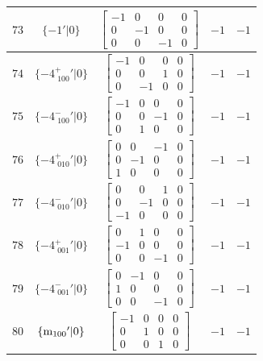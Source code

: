 \documentclass[fleqn,8pt]{jsarticle}
\begin{document}
\begin{longtable}{ccccc}
$ 73 $ & $ \{-1{}'|0\} $ & $ \begin{bmatrix} -1 & 0 & 0 & 0 \\ 0 & -1 & 0 & 0 \\ 0 & 0 & -1 & 0 \end{bmatrix} $ & $ -1 $ & $ -1 $ \\ \hline
$ 74 $ & $ \{-4^{+}_{\,\,100}{}'|0\} $ & $ \begin{bmatrix} -1 & 0 & 0 & 0 \\ 0 & 0 & 1 & 0 \\ 0 & -1 & 0 & 0 \end{bmatrix} $ & $ -1 $ & $ -1 $ \\ \hline
$ 75 $ & $ \{-4^{-}_{\,\,100}{}'|0\} $ & $ \begin{bmatrix} -1 & 0 & 0 & 0 \\ 0 & 0 & -1 & 0 \\ 0 & 1 & 0 & 0 \end{bmatrix} $ & $ -1 $ & $ -1 $ \\ \hline
$ 76 $ & $ \{-4^{+}_{\,\,010}{}'|0\} $ & $ \begin{bmatrix} 0 & 0 & -1 & 0 \\ 0 & -1 & 0 & 0 \\ 1 & 0 & 0 & 0 \end{bmatrix} $ & $ -1 $ & $ -1 $ \\ \hline
$ 77 $ & $ \{-4^{-}_{\,\,010}{}'|0\} $ & $ \begin{bmatrix} 0 & 0 & 1 & 0 \\ 0 & -1 & 0 & 0 \\ -1 & 0 & 0 & 0 \end{bmatrix} $ & $ -1 $ & $ -1 $ \\ \hline
$ 78 $ & $ \{-4^{+}_{\,\,001}{}'|0\} $ & $ \begin{bmatrix} 0 & 1 & 0 & 0 \\ -1 & 0 & 0 & 0 \\ 0 & 0 & -1 & 0 \end{bmatrix} $ & $ -1 $ & $ -1 $ \\ \hline
$ 79 $ & $ \{-4^{-}_{\,\,001}{}'|0\} $ & $ \begin{bmatrix} 0 & -1 & 0 & 0 \\ 1 & 0 & 0 & 0 \\ 0 & 0 & -1 & 0 \end{bmatrix} $ & $ -1 $ & $ -1 $ \\ \hline
$ 80 $ & $ \{{\rm m}_{100}{}'|0\} $ & $ \begin{bmatrix} -1 & 0 & 0 & 0 \\ 0 & 1 & 0 & 0 \\ 0 & 0 & 1 & 0 \end{bmatrix} $ & $ -1 $ & $ -1 $ \\ \hline

\end{longtable}
\end{document}
